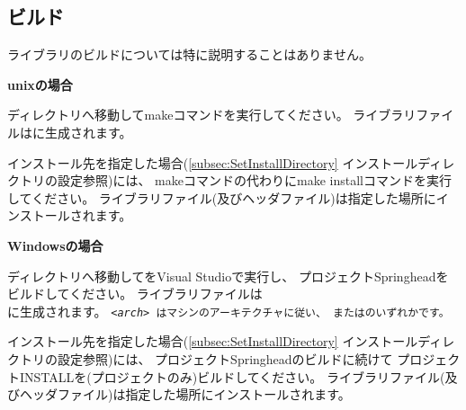 \subsection{ビルド}
\label{subsec:Build}
\parindent=0pt

ライブラリのビルドについては特に説明することはありません。

\medskip
\bf{unixの場合}
\begin{narrow}
	ディレクトリ\BldDir へ移動してmakeコマンドを実行してください。
	ライブラリファイルはに生成されます。

	インストール先を指定した場合(\KQuoteS \ref{subsec:SetInstallDirectory} 
	インストールディレクトリの設定\KQuoteE 参照)には、
	makeコマンドの代わりにmake installコマンドを実行してください。
	ライブラリファイル(及びヘッダファイル)は指定した場所にインストールされます。
\end{narrow}

\medskip
\bf{Windowsの場合}
\begin{narrow}
	ディレクトリ\BldDir へ移動してをVisual Studioで実行し、
	プロジェクトSpringheadをビルドしてください。
	ライブラリファイルは\\
	に生成されます。
	\tt{<\it{arch}>} はマシンのアーキテクチャに従い、
	またはのいずれかです。

	インストール先を指定した場合(\KQuoteS \ref{subsec:SetInstallDirectory} 
	インストールディレクトリの設定\KQuoteE 参照)には、
	プロジェクトSpringheadのビルドに続けて
	プロジェクトINSTALLを(プロジェクトのみ)ビルドしてください。
	ライブラリファイル(及びヘッダファイル)は指定した場所にインストールされます。
\end{narrow}

\bigskip
\thinrule{\linewidth}
%
%
%
\medskip

